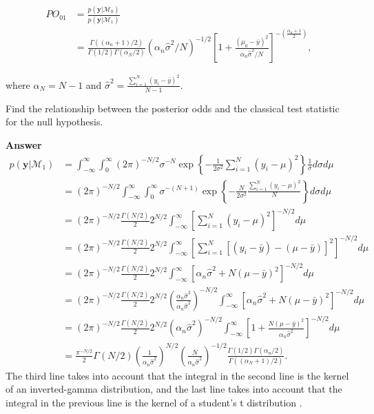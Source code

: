 \begin{enumerate}[leftmargin=*]
\begin{align*}
	PO_{01}&=\frac{p(\mathbf{y}|\mathcal{M}_0)}{p(\mathbf{y}|\mathcal{M}_1)}\\
	& =\frac{\Gamma((\alpha_n+1)/2)}{\Gamma(1/2)\Gamma(\alpha_N/2)}(\alpha_n\hat{\sigma}^2/N)^{-1/2}\left[1+\frac{(\mu_0-\bar{y})^2}{\alpha_n\hat{\sigma}^2/N}\right]^{-\left(\frac{\alpha_n+1}{2}\right)},
\end{align*}

where $\alpha_N=N-1$ and $\hat{\sigma}^2=\frac{\sum_{i=1}^N (y_i-\bar{y})^2}{N-1}$. 

Find the relationship between the posterior odds and the classical test statistic for the null hypothesis. 

\textbf{Answer}
{\footnotesize{
\begin{align*}
	p(\mathbf{y}|\mathcal{M}_1)&=\int_{-\infty}^{\infty}\int_{0}^{\infty} (2\pi)^{-N/2}\sigma^{-N}\exp\left\{-\frac{1}{2\sigma^2}\sum_{i=1}^N (y_i-\mu)^2\right\}\frac{1}{\sigma}d\sigma d\mu\\
	&=(2\pi)^{-N/2}\int_{-\infty}^{\infty}\int_{0}^{\infty} \sigma^{-(N+1)}\exp\left\{-\frac{N}{2\sigma^2}\frac{\sum_{i=1}^N (y_i-\mu)^2}{N}\right\}d\sigma d\mu\\
	&=(2\pi)^{-N/2}\frac{\Gamma(N/2)}{2}2^{N/2}\int_{-\infty}^{\infty}\left[\sum_{i=1}^N (y_i-\mu)^2\right]^{-N/2}d\mu\\
	&=(2\pi)^{-N/2}\frac{\Gamma(N/2)}{2}2^{N/2}\int_{-\infty}^{\infty}\left[\sum_{i=1}^N [(y_i-\bar{y})-(\mu-\bar{y})]^2\right]^{-N/2}d\mu\\
	&=(2\pi)^{-N/2}\frac{\Gamma(N/2)}{2}2^{N/2}\int_{-\infty}^{\infty}\left[\alpha_n\hat{\sigma}^2+N(\mu-\bar{y})^2\right]^{-N/2}d\mu\\
	&=(2\pi)^{-N/2}\frac{\Gamma(N/2)}{2}2^{N/2}\left(\frac{\alpha_n\hat{\sigma}^2}{\alpha_n\hat{\sigma}^2}\right)^{-N/2}\int_{-\infty}^{\infty}\left[\alpha_n\hat{\sigma}^2+N(\mu-\bar{y})^2\right]^{-N/2}d\mu\\
	&=(2\pi)^{-N/2}\frac{\Gamma(N/2)}{2}2^{N/2}\left(\alpha_n\hat{\sigma}^2\right)^{-N/2}\int_{-\infty}^{\infty}\left[1+\frac{N(\mu-\bar{y})^2}{\alpha_n\hat{\sigma}^2}\right]^{-N/2}d\mu\\
	&=\frac{\pi^{-N/2}}{2}\Gamma(N/2)\left(\frac{1}{\alpha_n\hat{\sigma}^2}\right)^{N/2}\left(\frac{N}{\alpha_n\hat{\sigma}^2}\right)^{-1/2}\frac{\Gamma(1/2)\Gamma(\alpha_n/2)}{\Gamma((\alpha_N+1)/2)}.
\end{align*} 
}}
The third line takes into account that the integral in the second line is the kernel of an inverted-gamma distribution, and the last line takes into account that the integral in the previous line is the kernel of a student's t distribution \cite{zellner1996introduction}.



\end{enumerate}
